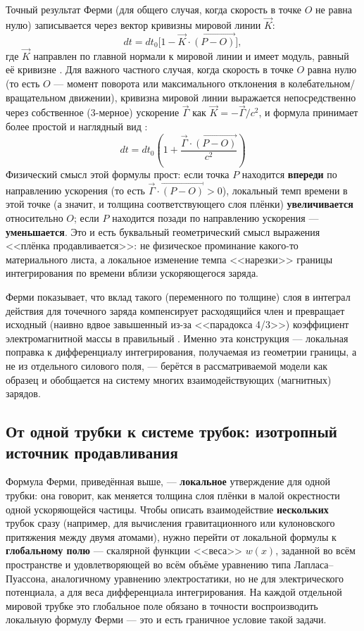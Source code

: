 \documentclass[12pt,a4paper]{article}
\begin{document}
Точный результат Ферми (для общего случая, когда скорость в точке $O$
не равна нулю) записывается через вектор кривизны мировой линии
$\vec K$:
\begin{equation}
dt = dt_0\Big[1-\vec K\cdot\overrightarrow{(P-O)}\Big],
\end{equation}
где $\vec K$ направлен по главной нормали к мировой линии и имеет
модуль, равный её кривизне \cite{Fermi1923}. Для важного частного
случая, когда скорость в точке $O$ равна нулю (то есть $O$ --- момент
поворота или максимального отклонения в колебательном/вращательном
движении), кривизна мировой линии выражается непосредственно через
собственное (3-мерное) ускорение $\vec\Gamma$ как $\vec
K=-\vec\Gamma/c^2$, и формула принимает более простой и наглядный вид
\cite{Fermi1923}:
\begin{equation}
\boxed{\ dt = dt_0\left(1+\frac{\vec\Gamma\cdot\overrightarrow{(P-O)}}{c^2}\right)\ }
\end{equation}
Физический смысл этой формулы прост: если точка $P$ находится
\textbf{впереди} по направлению ускорения (то есть
$\vec\Gamma\cdot\overrightarrow{(P-O)}>0$), локальный темп времени в
этой точке (а значит, и толщина соответствующего слоя плёнки)
\textbf{увеличивается} относительно $O$; если $P$ находится позади по
направлению ускорения --- \textbf{уменьшается}. Это и есть буквальный
геометрический смысл выражения <<плёнка продавливается>>: не
физическое проминание какого-то материального листа, а локальное
изменение темпа <<нарезки>> границы интегрирования по времени вблизи
ускоряющегося заряда.

Ферми показывает, что вклад такого (переменного по толщине) слоя в
интеграл действия для точечного заряда компенсирует расходящийся член
и превращает исходный (наивно вдвое завышенный из-за <<парадокса
4/3>>) коэффициент электромагнитной массы в правильный
\cite{Fermi1923}. Именно эта конструкция --- локальная поправка к
дифференциалу интегрирования, получаемая из геометрии границы, а не
из отдельного силового поля, --- берётся в рассматриваемой модели как
образец и обобщается на систему многих взаимодействующих (магнитных)
зарядов.

\subsection{От одной трубки к системе трубок: изотропный источник продавливания}
\label{sec:isotropic-source}

Формула Ферми, приведённая выше, --- \textbf{локальное} утверждение
для одной трубки: она говорит, как меняется толщина слоя плёнки в
малой окрестности одной ускоряющейся частицы. Чтобы описать
взаимодействие \textbf{нескольких} трубок сразу (например, для
вычисления гравитационного или кулоновского притяжения между двумя
атомами), нужно перейти от локальной формулы к \textbf{глобальному
полю} --- скалярной функции <<веса>> $w(x)$, заданной во всём
пространстве и удовлетворяющей во всём объёме уравнению типа
Лапласа--Пуассона, аналогичному уравнению электростатики, но не для
электрического потенциала, а для веса дифференциала интегрирования.
На каждой отдельной мировой трубке это глобальное поле обязано в
точности воспроизводить локальную формулу Ферми --- это и есть
граничное условие такой задачи.
\end{document}
